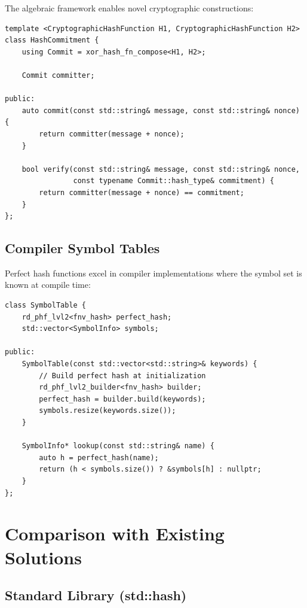 \documentclass[11pt,a4paper]{article}
\theoremstyle{definition}
\begin{document}
The algebraic framework enables novel cryptographic constructions:

\begin{lstlisting}[caption={Commitment scheme using hash composition}]
template <CryptographicHashFunction H1, CryptographicHashFunction H2>
class HashCommitment {
    using Commit = xor_hash_fn_compose<H1, H2>;

    Commit committer;

public:
    auto commit(const std::string& message, const std::string& nonce) {
        return committer(message + nonce);
    }

    bool verify(const std::string& message, const std::string& nonce,
                const typename Commit::hash_type& commitment) {
        return committer(message + nonce) == commitment;
    }
};
\end{lstlisting}

\subsection{Compiler Symbol Tables}

Perfect hash functions excel in compiler implementations where the symbol set is known at compile time:

\begin{lstlisting}[caption={Compiler symbol table with perfect hashing}]
class SymbolTable {
    rd_phf_lvl2<fnv_hash> perfect_hash;
    std::vector<SymbolInfo> symbols;

public:
    SymbolTable(const std::vector<std::string>& keywords) {
        // Build perfect hash at initialization
        rd_phf_lvl2_builder<fnv_hash> builder;
        perfect_hash = builder.build(keywords);
        symbols.resize(keywords.size());
    }

    SymbolInfo* lookup(const std::string& name) {
        auto h = perfect_hash(name);
        return (h < symbols.size()) ? &symbols[h] : nullptr;
    }
};
\end{lstlisting}

\section{Comparison with Existing Solutions}

\subsection{Standard Library (std::hash)}
\end{document}

